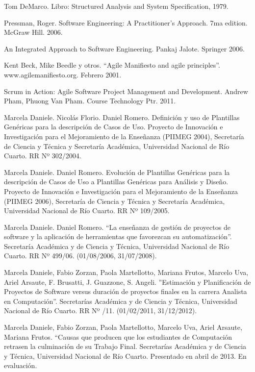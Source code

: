 
\begin{thebibliography}{10}

Tom DeMarco. Libro: Structured Analysis and System Specification, 1979.

Pressman, Roger. Software Engineering: A Practitioner's Approach. 7ma edition. McGraw Hill. 2006.

An Integrated Approach to Software Engineering. Pankaj Jalote. Springer 2006. 

Kent Beck, Mike Beedle y otros. “Agile Manifiesto and agile principles”. www.agilemanifiesto.org. Febrero 2001.

Scrum in Action: Agile Software Project Management and Development. Andrew Pham, Phuong Van Pham. Course Technology Ptr. 2011.

Marcela Daniele. Nicolás Florio. Daniel Romero. Definición y uso de Plantillas Genéricas para la descripción de Casos de Uso. Proyecto de Innovación e Investigación para el Mejoramiento de la Enseñanza (PIIMEG 2004), Secretaría de Ciencia y Técnica y Secretaría Académica, Universidad Nacional de Río Cuarto. RR Nº 302/2004. 

Marcela Daniele. Daniel Romero. Evolución de Plantillas Genéricas para la descripción de Casos de Uso a Plantillas Genéricas para Análisis y Diseño. Proyecto de Innovación e Investigación para el Mejoramiento de la Enseñanza (PIIMEG 2006), Secretaría de Ciencia y Técnica y Secretaría Académica, Universidad Nacional de Río Cuarto. RR Nº 109/2005. 

Marcela Daniele. Daniel Romero. “La enseñanza de gestión de proyectos de software y la aplicación de herramientas que favorezcan su automatización”. Secretaría Académica y de Ciencia y Técnica, Universidad Nacional de Río Cuarto. RR Nº 499/06. (01/08/2006, 31/07/2008).

Marcela Daniele, Fabio Zorzan, Paola Martellotto, Mariana Frutos, Marcelo Uva, Ariel Arsaute, F. Brusatti, J. Guazzone, S. Angeli. ”Estimación y Planificación de Proyectos de Software versus duración de proyectos finales en la carrera Analista en Computación”. Secretarías Académica y de Ciencia y Técnica, Universidad Nacional de Río Cuarto. RR Nº /11. (01/02/2011, 31/12/2012).

Marcela Daniele, Fabio Zorzan, Paola Martellotto, Marcelo Uva, Ariel Arsaute, Mariana Frutos. “Causas que producen que los estudiantes de Computación retrasen la culminación de su Trabajo Final. Secretarías Académica y de Ciencia y Técnica, Universidad Nacional de Río Cuarto. Presentado en abril de 2013. En evaluación.


\end{thebibliography}
